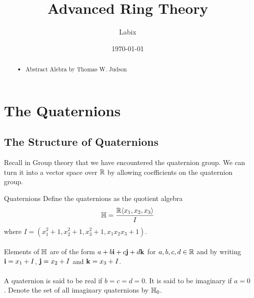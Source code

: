 \documentclass[a4paper]{article}
\title{Advanced Ring Theory}
\author{Labix}
\date{\today}
\begin{document}
\maketitle
\begin{abstract}
\begin{itemize}
\item Abstract Alebra by Thomas W. Judson
\end{itemize}
\end{abstract}
\pagebreak
\tableofcontents

\pagebreak

\section{The Quaternions}
\subsection{The Structure of Quaternions}
Recall in Group theory that we have encountered the quaternion group. We can turn it into a vector space over $\mathbb{R}$ by allowing coefficients on the quaternion group. 

\begin{defn}{Quaternions}{} Define the quaternions as the quotient algebra $$\mathbb{H}=\frac{\mathbb{R}\langle x_1,x_2,x_3\rangle}{I}$$ where $I=(x_1^2+1,x_2^2+1,x_3^2+1,x_1x_2x_3+1)$. \\~\\
Elements of $\mathbb{H}$ are of the form $a+b\vb{i}+c\vb{j}+d\vb{k}$ for $a,b,c,d\in\mathbb{R}$ and by writing $\vb{i}=x_1+I$, $\vb{j}=x_2+I$ and $\vb{k}=x_3+I$. \\~\\
A quaternion is said to be real if $b=c=d=0$. It is said to be imaginary if $a=0$. Denote the set of all imaginary quaternions by $\mathbb{H}_0$. 
\end{defn}
\end{document}
